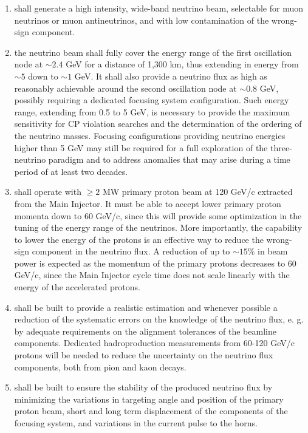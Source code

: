 \begin{enumerate} 
\item shall generate a high intensity, wide-band neutrino beam, selectable for muon neutrinos or muon antineutrinos, and with low contamination of the wrong-sign component.
\item the neutrino beam shall fully cover the energy range of the first oscillation node at $\sim 2.4$ GeV for a distance of 1,300 km, thus extending in energy from $\sim 5$ down to $\sim 1$ GeV. It shall also provide a neutrino flux as high as reasonably achievable around the second oscillation node at $\sim 0.8$ GeV, possibly requiring a dedicated focusing system configuration. Such energy range, extending from 0.5 to 5 GeV, is necessary to provide the maximum sensitivity for CP violation searches and the determination of the ordering of the neutrino masses. Focusing configurations providing neutrino energies higher than 5 GeV may still be required for a full exploration of the three-neutrino paradigm and to address anomalies that may arise during a time period of at least two decades. 
\item shall operate with $\geq 2$ MW primary proton beam at 120 GeV/c extracted from the Main Injector. It must be able to accept lower primary proton momenta down to 60 GeV/c, since this will provide some optimization in the tuning of the energy range of the neutrinos. More importantly, the capability to lower the energy of the protons is an effective way to reduce the wrong-sign component in the neutrino flux. A reduction of up to $\sim 15 \%$ in beam power is expected as the momentum of the primary protons decreases to 60 GeV/c, since the Main Injector cycle time does not scale linearly with the energy of the accelerated protons.
\item shall be built to provide a realistic estimation and whenever possible a reduction of the systematic errors on the knowledge of the neutrino flux, e. g. by adequate requirements on the alignment tolerances of the beamline components. Dedicated hadroproduction measurements from 60-120 GeV/c protons will be needed to reduce the uncertainty on the neutrino flux components, both from pion and kaon decays. 
\item shall be built to ensure the stability of the produced neutrino flux by minimizing the variations in targeting angle and position of the primary proton beam, short and long term displacement of the components of the focusing system, and variations in the current pulse to the horns.
\end{enumerate}

